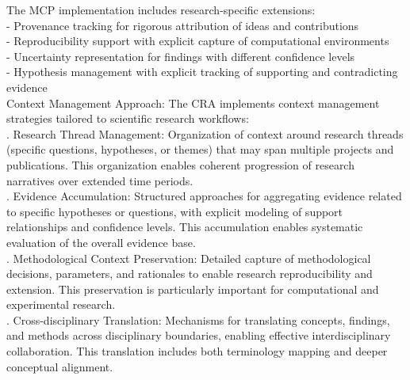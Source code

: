 The MCP implementation includes research-specific extensions:\\ \newline
- Provenance tracking for rigorous attribution of ideas and contributions\\ \newline
- Reproducibility support with explicit capture of computational environments\\ \newline
- Uncertainty representation for findings with different confidence levels\\ \newline
- Hypothesis management with explicit tracking of supporting and contradicting evidence\\ \newline
Context Management Approach: The CRA implements context management strategies tailored to scientific research workflows:\\ . Research Thread Management: Organization of context around research threads (specific questions, hypotheses, or themes) that may span multiple projects and publications. This organization enables coherent progression of research narratives over extended time periods.\\ . Evidence Accumulation: Structured approaches for aggregating evidence related to specific hypotheses or questions, with explicit modeling of support relationships and confidence levels. This accumulation enables systematic evaluation of the overall evidence base.\\ . Methodological Context Preservation: Detailed capture of methodological decisions, parameters, and rationales to enable research reproducibility and extension. This preservation is particularly important for computational and experimental research.\\ . Cross-disciplinary Translation: Mechanisms for translating concepts, findings, and methods across disciplinary boundaries, enabling effective interdisciplinary collaboration. This translation includes both terminology mapping and deeper conceptual alignment.\\
